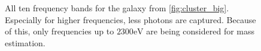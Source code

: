 \begin{figure}[H]

\vspace{1em}

\caption{All ten frequency bands for the galaxy from \autoref{fig:cluster_big}. Especially for higher frequencies, less photons are captured. Because of this, only frequencies up to $2300\text{eV}$ are being considered for mass estimation.}
\label{fig:cluster_big_freq}

\end{figure}
